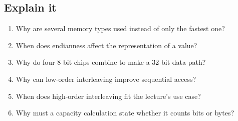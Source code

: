 \documentclass[11pt]{article}
\begin{document}
\begin{keepsection}
\section{Explain it}

\begin{enumerate}
\item Why are several memory types used instead of only the fastest one?
\item When does endianness affect the representation of a value?
\item Why do four 8-bit chips combine to make a 32-bit data path?
\item Why can low-order interleaving improve sequential access?
\item When does high-order interleaving fit the lecture’s use case?
\item Why must a capacity calculation state whether it counts bits or bytes?
\end{enumerate}

\end{keepsection}

\clearpage
\end{document}
